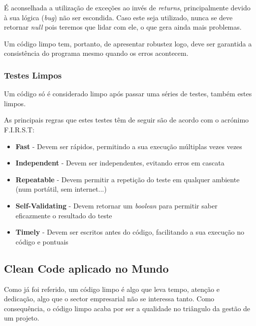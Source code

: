 \documentclass[10pt,portuguese]{article}
\begin{document}
\Par É aconselhada a utilização de exceções ao invés de \textit{returns}, principalmente devido à sua lógica (\textit{bug}) não ser escondida. Caso este seja utilizado, nunca se deve retornar \textit{null} pois teremos que lidar com ele, o que gera ainda mais problemas. 

\par Um código limpo tem, portanto, de apresentar robustez logo, deve ser garantida a consistência do programa mesmo quando os erros acontecem.

\subsubsection{Testes Limpos}

\Par Um código só é considerado limpo após passar uma séries de testes, também estes limpos.

\Par As principais regras que estes testes têm de seguir são de acordo com o acrónimo F.I.R.S.T:

\begin{itemize}
    \item \textbf{Fast} - Devem ser rápidos, permitindo a sua execução múltiplas vezes vezes
    \item \textbf{Independent} - Devem ser independentes, evitando erros em cascata
    \item \textbf{Repeatable} - Devem permitir a repetição do teste em qualquer ambiente (num portátil, sem internet...)
    \item \textbf{Self-Validating} - Devem retornar um \textit{boolean} para permitir saber eficazmente o resultado do teste
    \item \textbf{Timely} - Devem ser escritos antes do código, facilitando a sua execução no código e pontuais
\end{itemize}

\clearpage

\subsection{Clean Code aplicado no Mundo}

\Par Como já foi referido, um código limpo é algo que leva tempo, atenção e dedicação, algo que o sector empresarial não se interessa tanto. Como consequência, o código limpo acaba por ser a qualidade no triângulo da gestão de um projeto.
\end{document}
